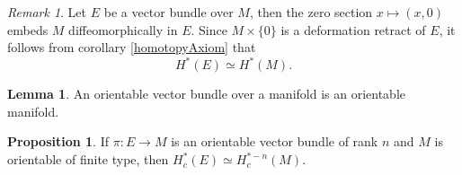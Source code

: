 \documentclass[twocolumn]{article}
\theoremstyle{definition}
\newtheorem{lemma}[definition]{Lemma}
\newtheorem{proposition}[definition]{Proposition}
\theoremstyle{remark}
\newtheorem*{remark}{Remark}
\begin{document}
\begin{remark}
    Let $E$ be a vector bundle over $M$, then the zero section $x \mapsto (x, 0)$ embeds $M$ diffeomorphically in $E$.
    Since $M \times \{0 \}$ is a deformation retract of $E$, it follows from corollary \ref{homotopyAxiom} that
    \begin{equation}
        H^*(E) \simeq H^*(M).
    \end{equation}
\end{remark}
\begin{lemma}
    An orientable vector bundle over a manifold is an orientable manifold.
\end{lemma}
\begin{proposition}
    If $\pi: E \rightarrow M$ is an orientable vector bundle of rank $n$ and $M$ is orientable of finite type, then $H_c^*(E) \simeq H_c^{*-n}(M)$.
\end{proposition}
\end{document}
